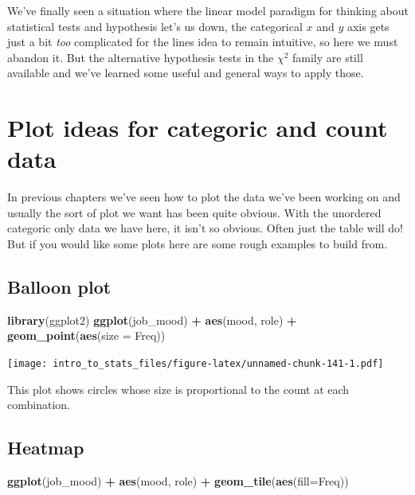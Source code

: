 \documentclass[
]{book}
\newenvironment{Shaded}{\begin{snugshade}}{\end{snugshade}}
\newcommand{\DataTypeTok}[1]{\textcolor[rgb]{0.13,0.29,0.53}{#1}}
\newcommand{\KeywordTok}[1]{\textcolor[rgb]{0.13,0.29,0.53}{\textbf{#1}}}
\newcommand{\NormalTok}[1]{#1}
\newcommand{\OperatorTok}[1]{\textcolor[rgb]{0.81,0.36,0.00}{\textbf{#1}}}
\newcommand{\StringTok}[1]{\textcolor[rgb]{0.31,0.60,0.02}{#1}}
\begin{document}
We've finally seen a situation where the linear model paradigm for thinking about statistical tests and hypothesis let's us down, the categorical \(x\) and \(y\) axis gets just a bit \emph{too} complicated for the lines idea to remain intuitive, so here we must abandon it. But the alternative hypothesis tests in the \(\chi^2\) family are still available and we've learned some useful and general ways to apply those.

\hypertarget{plot-ideas-for-categoric-and-count-data}{%
\section{Plot ideas for categoric and count data}\label{plot-ideas-for-categoric-and-count-data}}

In previous chapters we've seen how to plot the data we've been working on and usually the sort of plot we want has been quite obvious. With the unordered categoric only data we have here, it isn't so obvious. Often just the table will do! But if you would like some plots here are some rough examples to build from.

\hypertarget{balloon-plot}{%
\subsection{Balloon plot}\label{balloon-plot}}

\begin{Shaded}
\begin{Highlighting}[]
\KeywordTok{library}\NormalTok{(ggplot2)}
\KeywordTok{ggplot}\NormalTok{(job_mood) }\OperatorTok{+}\StringTok{ }\KeywordTok{aes}\NormalTok{(mood, role) }\OperatorTok{+}\StringTok{ }\KeywordTok{geom_point}\NormalTok{(}\KeywordTok{aes}\NormalTok{(}\DataTypeTok{size =}\NormalTok{ Freq))}
\end{Highlighting}
\end{Shaded}

\texttt{[image: intro\_to\_stats\_files/figure-latex/unnamed-chunk-141-1.pdf]}

This plot shows circles whose size is proportional to the count at each combination.

\hypertarget{heatmap}{%
\subsection{Heatmap}\label{heatmap}}

\begin{Shaded}
\begin{Highlighting}[]
\KeywordTok{ggplot}\NormalTok{(job_mood) }\OperatorTok{+}\StringTok{ }\KeywordTok{aes}\NormalTok{(mood, role) }\OperatorTok{+}\StringTok{ }\KeywordTok{geom_tile}\NormalTok{(}\KeywordTok{aes}\NormalTok{(}\DataTypeTok{fill=}\NormalTok{Freq))}
\end{Highlighting}
\end{Shaded}
\end{document}
